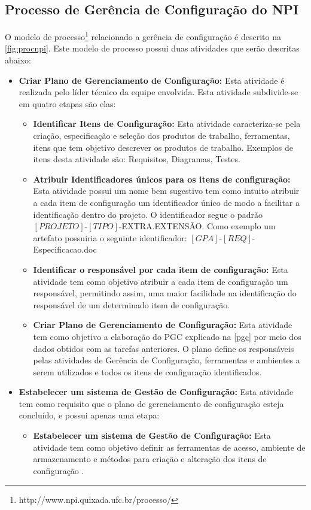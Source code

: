 \subsection{Processo de Gerência de Configuração do NPI}
O modelo de processo\footnote{http://www.npi.quixada.ufc.br/processo/} relacionado a gerência de configuração é descrito na \autoref{fig:procnpi}. Este modelo de processo possui duas atividades que serão descritas abaixo:
\begin{itemize}
\item \textbf{Criar Plano de Gerenciamento de Configuração:} Esta atividade é realizada pelo líder técnico da equipe envolvida. Esta atividade subdivide-se em quatro etapas são elas:
\begin{itemize}
\item \textbf{Identificar Itens de Configuração:} Esta atividade caracteriza-se pela criação, especificação e seleção dos produtos de trabalho, ferramentas, itens que tem objetivo descrever os produtos de trabalho. Exemplos de itens desta atividade são: Requisitos, Diagramas, Testes.

\item \textbf{Atribuir Identificadores únicos para os itens de configuração:} Esta atividade possui um nome bem sugestivo tem como intuito atribuir a cada item de configuração um identificador único de modo a facilitar a identificação dentro do projeto. O identificador segue o padrão $\left[PROJETO\right]$-$\left[TIPO\right]$-EXTRA.EXTENSÃO. Como exemplo um artefato possuiria o seguinte identificador: $\left[GPA\right]$-$\left[REQ\right]$-Especificacao.doc

\item \textbf{Identificar o responsável por cada item de configuração:} Esta atividade tem como objetivo atribuir a cada item de configuração um responsável, permitindo assim, uma maior facilidade na identificação do responsável de um determinado item de configuração.
\item \textbf{Criar	Plano de Gerenciamento de Configuração:} Esta atividade tem como objetivo a elaboração do PGC explicado na \autoref{pgc} por meio dos dados obtidos com as tarefas anteriores. O plano define os responsáveis pelas atividades de Gerência de Configuração, ferramentas e ambientes a serem utilizados e todos os itens de configuração identificados.
\end{itemize}
\item \textbf{Estabelecer um sistema de Gestão de Configuração:} Esta atividade tem como requisito que o plano de gerenciamento de configuração esteja concluído, e possui apenas uma etapa:
\begin{itemize}
\item \textbf{Estabelecer um sistema de Gestão de Configuração:} Esta atividade tem como objetivo definir as ferramentas de acesso, ambiente de armazenamento e métodos para criação e alteração dos itens de configuração \cite{processonpi}. 
\end{itemize}
\end{itemize}


